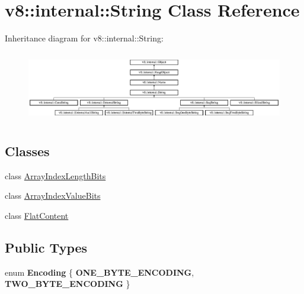\hypertarget{classv8_1_1internal_1_1_string}{}\section{v8\+:\+:internal\+:\+:String Class Reference}
\label{classv8_1_1internal_1_1_string}
Inheritance diagram for v8\+:\+:internal\+:\+:String\+:\begin{figure}[H]
\begin{center}
\leavevmode
\includegraphics[height=3.125581cm]{classv8_1_1internal_1_1_string}
\end{center}
\end{figure}
\subsection*{Classes}
\begin{DoxyCompactItemize}
\item 
class \hyperlink{classv8_1_1internal_1_1_string_1_1_array_index_length_bits}{Array\+Index\+Length\+Bits}
\item 
class \hyperlink{classv8_1_1internal_1_1_string_1_1_array_index_value_bits}{Array\+Index\+Value\+Bits}
\item 
class \hyperlink{classv8_1_1internal_1_1_string_1_1_flat_content}{Flat\+Content}
\end{DoxyCompactItemize}
\subsection*{Public Types}
\begin{DoxyCompactItemize}
\item 
\hypertarget{classv8_1_1internal_1_1_string_a538c62114120f52395d17c186574b6db}{}enum {\bfseries Encoding} \{ {\bfseries O\+N\+E\+\_\+\+B\+Y\+T\+E\+\_\+\+E\+N\+C\+O\+D\+I\+N\+G}, 
{\bfseries T\+W\+O\+\_\+\+B\+Y\+T\+E\+\_\+\+E\+N\+C\+O\+D\+I\+N\+G}
 \}\label{classv8_1_1internal_1_1_string_a538c62114120f52395d17c186574b6db}

\end{DoxyCompactItemize}
